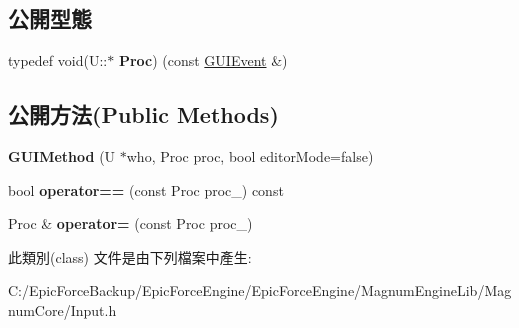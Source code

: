 \subsection*{公開型態}
\begin{DoxyCompactItemize}
\item 
typedef void(U\+::$\ast$ {\bfseries Proc}) (const \hyperlink{class_magnum_1_1_input_1_1_g_u_i_event}{G\+U\+I\+Event} \&)\hypertarget{class_magnum_1_1_input_1_1_g_u_i_method_a01234adf96d6a3535581c0ae8a911404}{}\label{class_magnum_1_1_input_1_1_g_u_i_method_a01234adf96d6a3535581c0ae8a911404}

\end{DoxyCompactItemize}
\subsection*{公開方法(Public Methods)}
\begin{DoxyCompactItemize}
\item 
{\bfseries G\+U\+I\+Method} (U $\ast$who, Proc proc, bool editor\+Mode=false)\hypertarget{class_magnum_1_1_input_1_1_g_u_i_method_a0fb6a6ac4fd0505d583841ebf5136c63}{}\label{class_magnum_1_1_input_1_1_g_u_i_method_a0fb6a6ac4fd0505d583841ebf5136c63}

\item 
bool {\bfseries operator==} (const Proc proc\+\_\+) const \hypertarget{class_magnum_1_1_input_1_1_g_u_i_method_a3b100d8ad13bf9ff67a2cdfa4c5b895c}{}\label{class_magnum_1_1_input_1_1_g_u_i_method_a3b100d8ad13bf9ff67a2cdfa4c5b895c}

\item 
Proc \& {\bfseries operator=} (const Proc proc\+\_\+)\hypertarget{class_magnum_1_1_input_1_1_g_u_i_method_a08c8a2bee955c4503c9b084c27490701}{}\label{class_magnum_1_1_input_1_1_g_u_i_method_a08c8a2bee955c4503c9b084c27490701}

\end{DoxyCompactItemize}


此類別(class) 文件是由下列檔案中產生\+:\begin{DoxyCompactItemize}
\item 
C\+:/\+Epic\+Force\+Backup/\+Epic\+Force\+Engine/\+Epic\+Force\+Engine/\+Magnum\+Engine\+Lib/\+Magnum\+Core/Input.\+h\end{DoxyCompactItemize}
